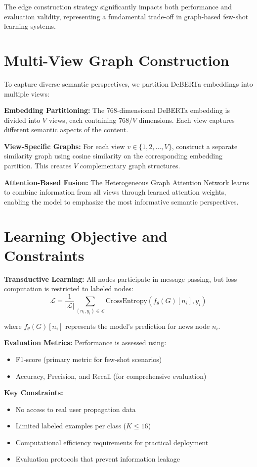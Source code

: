 The edge construction strategy significantly impacts both performance and evaluation validity, representing a fundamental trade-off in graph-based few-shot learning systems.

\section{Multi-View Graph Construction}

To capture diverse semantic perspectives, we partition DeBERTa embeddings into multiple views:

\textbf{Embedding Partitioning:} The 768-dimensional DeBERTa embedding is divided into $V$ views, each containing $768/V$ dimensions. Each view captures different semantic aspects of the content.

\textbf{View-Specific Graphs:} For each view $v \in \{1, 2, \ldots, V\}$, construct a separate similarity graph using cosine similarity on the corresponding embedding partition. This creates $V$ complementary graph structures.

\textbf{Attention-Based Fusion:} The Heterogeneous Graph Attention Network learns to combine information from all views through learned attention weights, enabling the model to emphasize the most informative semantic perspectives.

\section{Learning Objective and Constraints}

\textbf{Transductive Learning:} All nodes participate in message passing, but loss computation is restricted to labeled nodes:
\begin{equation}
\mathcal{L} = \frac{1}{|\mathcal{L}|} \sum_{(n_i, y_i) \in \mathcal{L}} \text{CrossEntropy}(f_\theta(G)[n_i], y_i)
\end{equation}

where $f_\theta(G)[n_i]$ represents the model's prediction for news node $n_i$.

\textbf{Evaluation Metrics:} Performance is assessed using:
\begin{itemize}
\item F1-score (primary metric for few-shot scenarios)
\item Accuracy, Precision, and Recall (for comprehensive evaluation)
\end{itemize}

\textbf{Key Constraints:}
\begin{itemize}
\item No access to real user propagation data
\item Limited labeled examples per class ($K \leq 16$)
\item Computational efficiency requirements for practical deployment
\item Evaluation protocols that prevent information leakage
\end{itemize}

